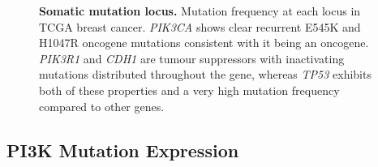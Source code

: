 \begin{figure}[!ht]
\begin{center}
{        }
    \end{center}
    \caption[Somatic mutation locus]{\small \textbf{Somatic mutation locus.} Mutation frequency at each locus in TCGA breast cancer. \textit{PIK3CA} shows clear recurrent E545K and H1047R oncogene mutations consistent with it being an oncogene. \textit{PIK3R1} and \textit{CDH1} are tumour suppressors with inactivating mutations distributed throughout the gene, whereas \textit{TP53} exhibits both of these properties and a very high mutation frequency compared to other genes.
}
\label{fig:mutation_locus}
\end{figure}

\clearpage
\subsection{PI3K Mutation Expression}

